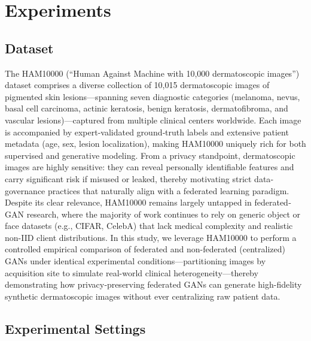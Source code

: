 \documentclass{article}
\begin{document}
\section{Experiments}
\subsection{Dataset}
The HAM10000 (“Human Against Machine with 10,000 dermatoscopic images”) dataset comprises a diverse collection of 10,015 dermatoscopic images of pigmented skin lesions—spanning seven diagnostic categories (melanoma, nevus, basal cell carcinoma, actinic keratosis, benign keratosis, dermatofibroma, and vascular lesions)—captured from multiple clinical centers worldwide. Each image is accompanied by expert-validated ground‐truth labels and extensive patient metadata (age, sex, lesion localization), making HAM10000 uniquely rich for both supervised and generative modeling. From a privacy standpoint, dermatoscopic images are highly sensitive: they can reveal personally identifiable features and carry significant risk if misused or leaked, thereby motivating strict data‐governance practices that naturally align with a federated learning paradigm. Despite its clear relevance, HAM10000 remains largely untapped in federated‐GAN research, where the majority of work continues to rely on generic object or face datasets (e.g., CIFAR, CelebA) that lack medical complexity and realistic non-IID client distributions. In this study, we leverage HAM10000 to perform a controlled empirical comparison of federated and non-federated (centralized) GANs under identical experimental conditions—partitioning images by acquisition site to simulate real-world clinical heterogeneity—thereby demonstrating how privacy‐preserving federated GANs can generate high-fidelity synthetic dermatoscopic images without ever centralizing raw patient data.

\subsection{Experimental Settings}
\end{document}
